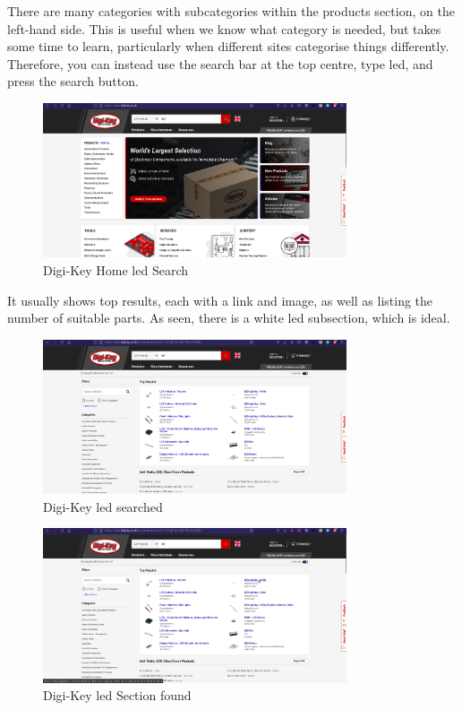 \documentclass[a4paper,11pt]{report}
\begin{document}
There are many categories with subcategories within the products section, on the left-hand side. This is useful when we know what category is needed, but takes some time to learn, particularly when different sites categorise things differently. Therefore, you can instead use the search bar at the top centre, type \gls{led}, and press the search button.

\begin{figure}[H]
\centering
\includegraphics[width=0.8\textwidth]{screenshots/DigiKeyHomeledSearch}
\caption{Digi-Key Home \gls{led} Search}
\end{figure}

It usually shows top results, each with a link and image, as well as listing the number of suitable parts. As seen, there is a white \gls{led} subsection, which is ideal.

\begin{figure}[H]
\centering
\includegraphics[width=0.8\textwidth]{screenshots/DigiKeyledSearched}
\caption{Digi-Key \gls{led} searched}
\end{figure}
\begin{figure}[H]
\centering
\includegraphics[width=0.8\textwidth]{screenshots/DigiKeyWhiteledSectionFound}
\caption{Digi-Key \gls{led} Section found}
\end{figure}
\end{document}

